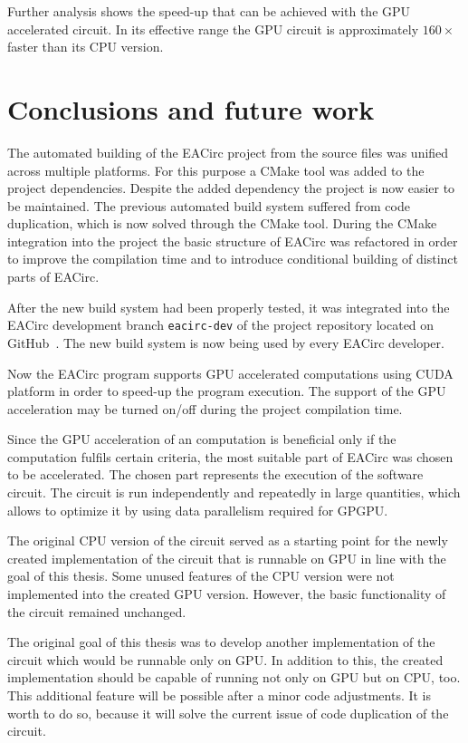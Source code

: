 \documentclass[12pt,twoside]{fithesis2}
\begin{document}
Further analysis shows the speed-up that can be achieved with the GPU accelerated circuit. In its effective range the GPU circuit is approximately $160\times$ faster than its CPU version.

\chapter{Conclusions and future work}

The automated building of the EACirc project from the source files was unified across multiple platforms. For this purpose a CMake tool was added to the project dependencies. Despite the added dependency the project is now easier to be maintained. The previous automated build system suffered from code duplication, which is now solved through the CMake tool. During the CMake integration into the project the basic structure of EACirc was refactored in order to improve the compilation time and to introduce conditional building of distinct parts of EACirc.

After the new build system had been properly tested, it was integrated into the EACirc development branch \texttt{eacirc-dev} of the project repository located on GitHub~\cite{eacirc_repo}. The new build system is now being used by every EACirc developer.

Now the EACirc program supports GPU accelerated computations using CUDA platform in order to speed-up the program execution. The support of the GPU acceleration may be turned on/off during the project compilation time.

Since the GPU acceleration of an computation is beneficial only if the computation fulfils certain criteria, the most suitable part of EACirc was chosen to be accelerated. The chosen part represents the execution of the software circuit. The circuit is run independently and repeatedly in large quantities, which allows to optimize it by using data parallelism required for GPGPU.

The original CPU version of the circuit served as a starting point for the newly created implementation of the circuit that is runnable on GPU in line with the goal of this thesis. Some unused features of the CPU version were not implemented into the created GPU version. However, the basic functionality of the circuit remained unchanged. 

The original goal of this thesis was to develop another implementation of the circuit which would be runnable only on GPU. In addition to this, the created implementation should be capable of running not only on GPU but on CPU, too. This additional feature will be possible after a minor code adjustments. It is worth to do so, because it will solve the current issue of code duplication of the circuit.
\end{document}
